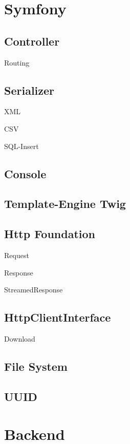 



\section{Symfony}

\subsection{Controller}

Routing

\subsection{Serializer}

XML

CSV

SQL-Insert

\subsection{Console}

\subsection{Template-Engine Twig}

\subsection{Http Foundation}

Request

Response

StreamedResponse

\subsection{HttpClientInterface}

Download

\subsection{File System}

\subsection{UUID}

\section{Backend}

